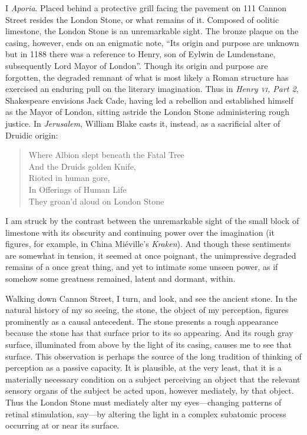 \documentclass[12pt]{article}
\begin{document}
I \emph{Aporia}. Placed behind a protective grill facing the pavement on 111 Cannon Street resides the London Stone, or what remains of it. Composed of oolitic limestone, the London Stone is an unremarkable sight. The bronze plaque on the casing, however, ends on an enigmatic note, ``Its origin and purpose are unknown but in 1188 there was a reference to Henry, son of Eylwin de Lundenstane, subsequently Lord Mayor of London''. Though its origin and purpose are forgotten, the degraded remnant of what is most likely a Roman structure has exercised an enduring pull on the literary imagination. Thus in \emph{Henry \textsc{vi}, Part 2}, Shakespeare envisions Jack Cade, having led a rebellion and established himself as the Mayor of London, sitting astride the London Stone administering rough justice. In \emph{Jerusalem}, William Blake casts it, instead, as a sacrificial alter of Druidic origin:
\begin{verse}
Where Albion slept beneath the Fatal Tree\\
And the Druids golden Knife,\\
Rioted in human gore,\\
In Offerings of Human Life\\
They groan'd aloud on London Stone
\end{verse}
I am struck by the contrast between the unremarkable sight of the small block of limestone with its obscurity and continuing power over the imagination (it figures, for example, in China Miéville's \emph{Kraken}). And though these sentiments are somewhat in tension, it seemed at once poignant, the unimpressive degraded remains of a once great thing, and yet to intimate some unseen power, as if somehow some greatness remained, latent and dormant, within.

Walking down Cannon Street, I turn, and look, and see the ancient stone. In the natural history of my so seeing, the stone, the object of my perception, figures prominently as a causal antecedent. The stone presents a rough appearance because the stone has that surface prior to its so appearing. And its rough gray surface, illuminated from above by the light of its casing, causes me to see that surface. This observation is perhaps the source of the long tradition of thinking of perception as a passive capacity. It is plausible, at the very least, that it is a materially necessary condition on a subject perceiving an object that the relevant sensory organs of the subject be acted upon, however mediately, by that object. Thus the London Stone must mediately alter my eyes---changing patterns of retinal stimulation, say---by altering the light in a complex subatomic process occurring at or near its surface.
\end{document}
